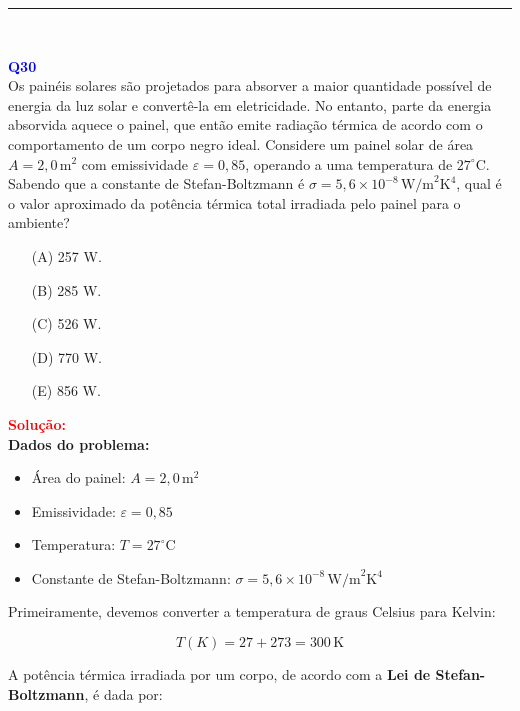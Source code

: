 \documentclass[a4paper,12pt]{article}
\begin{document}
\noindent\rule{\linewidth}{0.6pt}\\

\begin{flushleft}
\textbf{\textcolor{blue}{\Large Q30}}\\

Os painéis solares são projetados para absorver a maior quantidade possível de energia da luz solar e convertê-la em eletricidade. 
No entanto, parte da energia absorvida aquece o painel, que então emite radiação térmica de acordo com o comportamento de um corpo 
negro ideal. Considere um painel solar de área $A = 2,0 \, \text{m}^2$ com emissividade $\varepsilon = 0,85$, operando a uma 
temperatura de $27^\circ \text{C}$. Sabendo que a constante de Stefan-Boltzmann é $\sigma = 5,6 \times 10^{-8} \, \text{W/m}^2 \text{K}^4$, 
qual é o valor aproximado da potência térmica total irradiada pelo painel para o ambiente?


\begin{itemize}
\item[(A)] 257 W.
\item[(B)] 285 W. 
\item[(C)] 526 W.
\item[(D)] 770 W.
\item[(E)] 856 W.
\end{itemize}

\vspace{0.5cm}

\textcolor{red}{\textbf{Solução:}}\\

\textbf{Dados do problema:}

\begin{itemize}
    \item Área do painel: $A = 2,0 \, \text{m}^2$
    \item Emissividade: $\varepsilon = 0,85$
    \item Temperatura: $T = 27^\circ \text{C}$
    \item Constante de Stefan-Boltzmann: $\sigma = 5,6 \times 10^{-8} \, \text{W/m}^2\text{K}^4$
\end{itemize}

Primeiramente, devemos converter a temperatura de graus Celsius para Kelvin:

\[
T(K) = 27 + 273 = 300 \, \text{K}
\]

\bigskip

A potência térmica irradiada por um corpo, de acordo com a \textbf{Lei de Stefan-Boltzmann}, é dada por:


\end{flushleft}
\end{document}

